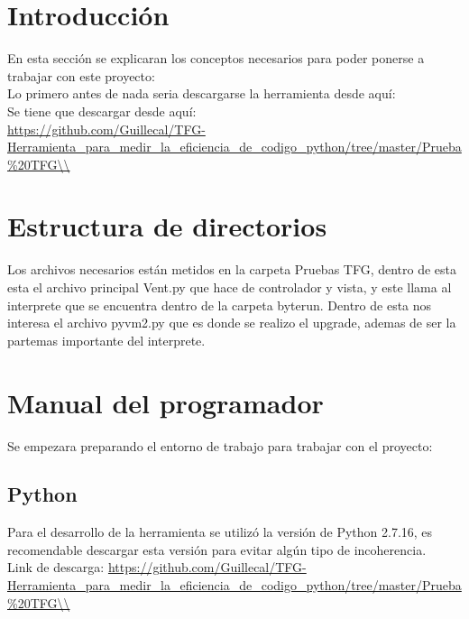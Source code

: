 


\section{Introducción}
En esta sección se explicaran los conceptos necesarios para poder ponerse a trabajar con este proyecto:\\

Lo primero antes de nada seria descargarse la herramienta desde aquí:\\

Se tiene que descargar desde aquí: \\

\url{https://github.com/Guillecal/TFG-Herramienta_para_medir_la_eficiencia_de_codigo_python/tree/master/Prueba%20TFG\\}



\section{Estructura de directorios}

Los archivos necesarios están metidos en la carpeta Pruebas TFG, dentro de esta esta el archivo principal Vent.py que hace de controlador y vista, y este llama al interprete que  se encuentra dentro de la carpeta byterun. Dentro de esta nos interesa el archivo pyvm2.py que es donde se realizo el upgrade, ademas de ser la partemas importante del interprete.\\

\section{Manual del programador}
Se empezara preparando el entorno de trabajo para trabajar con el proyecto:\\

\subsection{Python}
Para el desarrollo de la herramienta se utilizó la versión de Python 2.7.16, es recomendable descargar esta versión para evitar algún tipo de incoherencia.\\

Link de descarga: \url{https://github.com/Guillecal/TFG-Herramienta_para_medir_la_eficiencia_de_codigo_python/tree/master/Prueba%20TFG\\}

